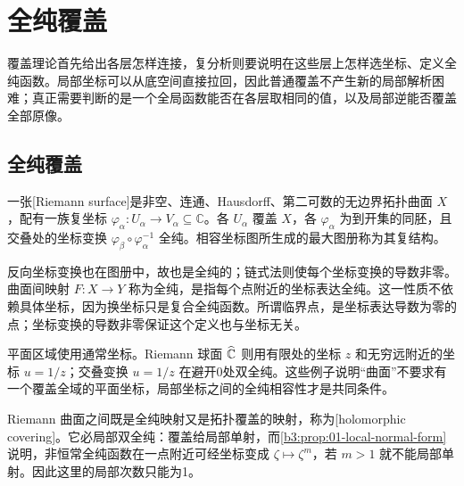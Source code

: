 \section{全纯覆盖}
\label{b3:sec:1102}

覆盖理论首先给出各层怎样连接，复分析则要说明在这些层上怎样选坐标、定义全纯函数。局部坐标可以从底空间直接拉回，因此普通覆盖不产生新的局部解析困难；真正需要判断的是一个全局函数能否在各层取相同的值，以及局部逆能否覆盖全部原像。

\subsection{全纯覆盖}
\label{b3:subsec:110201}

\begin{definition}\label{b3:def:11-riemann-surface}
一张[Riemann surface]是非空、连通、Hausdorff、第二可数的无边界拓扑曲面 \(X\)，配有一族复坐标 \(\varphi_\alpha:U_\alpha\to V_\alpha\subseteq\mathbb C\)。各 \(U_\alpha\) 覆盖 \(X\)，各 \(\varphi_\alpha\) 为到开集的同胚，且交叠处的坐标变换 \(\varphi_\beta\circ\varphi_\alpha^{-1}\) 全纯。相容坐标图所生成的最大图册称为其复结构。
\end{definition}
反向坐标变换也在图册中，故也是全纯的；链式法则使每个坐标变换的导数非零。曲面间映射 \(F:X\to Y\) 称为全纯，是指每个点附近的坐标表达全纯。这一性质不依赖具体坐标，因为换坐标只是复合全纯函数。所谓临界点，是坐标表达导数为零的点；坐标变换的导数非零保证这个定义也与坐标无关。

\ProseParagraphBreak
平面区域使用通常坐标。Riemann 球面 \(\widehat{\mathbb C\kern0pt}\) 则用有限处的坐标 \(z\) 和无穷远附近的坐标 \(u=1/z\)；交叠变换 \(u=1/z\) 在避开0处双全纯。这些例子说明“曲面”不要求有一个覆盖全域的平面坐标，局部坐标之间的全纯相容性才是共同条件。

\ProseParagraphBreak
Riemann 曲面之间既是全纯映射又是拓扑覆盖的映射，称为[holomorphic covering]。它必局部双全纯：覆盖给局部单射，而\cref{b3:prop:01-local-normal-form}说明，非恒常全纯函数在一点附近可经坐标变成 \(\zeta\mapsto\zeta^m\)，若 \(m>1\) 就不能局部单射。因此这里的局部次数只能为1。

